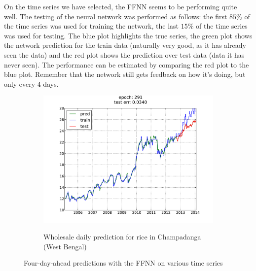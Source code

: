 On the time series we have selected, the FFNN seems to be performing quite
well. The testing of the neural network was performed as follows: the first
$85\%$ of the time series was used for training the network, the last $15\%$ of
the time series was used for testing. The blue plot highlights the true series,
the green plot shows the network prediction for the train data (naturally very
good, as it has already seen the data) and the red plot shows the prediction
over test data (data it has never seen). The performance can be estimated by
comparing the red plot to the blue plot. Remember that the network still gets
feedback on how it's doing, but only every 4 days.

\begin{figure}[H]
    \centering
        \begin{subfigure}[b]{.45\linewidth}
        \centering
        \includegraphics[width=\textwidth]{img/ffnn/7.pdf}
        \label{subfig:ffnn_pred_7}
        \caption{Wholesale daily prediction for rice in Champadanga (West Bengal)}
        \end{subfigure}
    \caption{Four-day-ahead predictions with the FFNN on various time series}
    \label{fig:ffnn_pred}
\end{figure}

